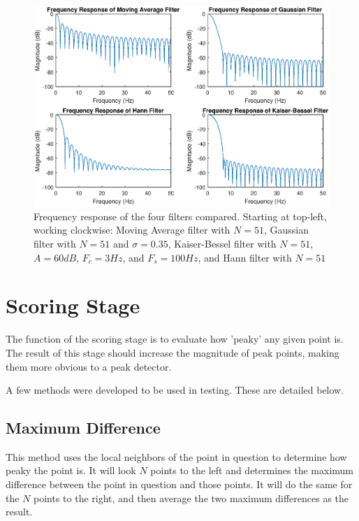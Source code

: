                 \begin{figure}[!th]
                    \includegraphics[width=\textwidth]{Images/compare_filters.eps}
                    \centering
                    \caption{Frequency response of the four filters compared. Starting at top-left, working clockwise: Moving Average filter with $N=51$, Gaussian filter with $N=51$ and $\sigma=0.35$, Kaiser-Bessel filter with $N=51$, $A=60dB$, $F_c = 3Hz$, and $F_s= 100Hz$, and Hann filter with $N=51$}
                    \label{img_compare_filters}
                \end{figure}  

        \section{Scoring Stage}

            The function of the scoring stage is to evaluate how 'peaky' any given point is. The result of this stage should increase the magnitude of peak points, making them more obvious to a peak detector.

            A few methods were developed to be used in testing. These are detailed below.

            \subsection{Maximum Difference}

                This method uses the local neighbors of the point in question to determine how peaky the point is. It will look $N$ points to the left and determines the maximum difference between the point in question and those points. It will do the same for the $N$ points to the right, and then average the two maximum differences as the result.

